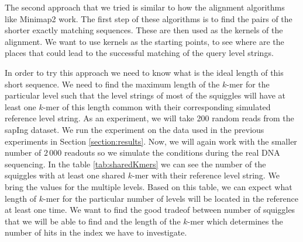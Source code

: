 The second approach that we tried is similar to how the alignment algorithms like
Minimap2 work. The first step of these algorithms is to find the pairs of the shorter
exactly matching sequences. These are then used as the kernels of the alignment. We want
to use kernels as the starting points, to see where are the places that could lead to the
successful matching of the query level strings.

In order to try this approach we need to know what is the ideal length of this short
sequence. We need to find the maximum length of the $k$-mer for the particular level
such that the level strings of most of the squiggles will have at least one $k$-mer
of this length common with their corresponding simulated reference level string.
As an experiment, we will take 200 random reads from the sapIng dataset.
We run the experiment on the data used in the previous experiments in Section
\ref{section:results}. Now, we will again work with the smaller number of $2\,000$ readouts so we
simulate the conditions during the real DNA sequencing. In the table \ref{tab:sharedKmers}
we can see the number of the squiggles with at least one shared $k$-mer with their reference
level string. We bring the values for the multiple levels. Based on this table,
we can expect what length of $k$-mer for the particular number of levels will be located
in the reference at least one time. We want to find the good tradeof between number of
squiggles that we will be able to find and the length of the $k$-mer which determines
the number of hits in the index we have to investigate.

